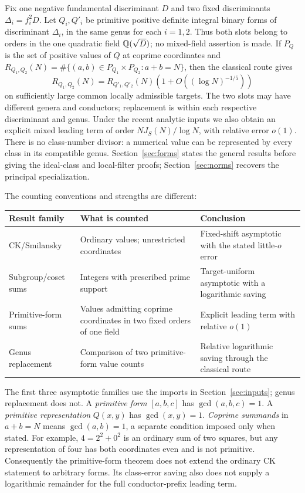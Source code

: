 Fix one negative fundamental discriminant \(D\) and two fixed
discriminants \(\Delta_i=f_i^2D\). Let \(Q_i,Q'_i\) be primitive
positive definite integral binary forms of discriminant \(\Delta_i\),
in the same genus for each \(i=1,2\). Thus both slots belong to
orders in the one quadratic field \(\mathbb Q(\sqrt D)\); no mixed-field
assertion is made. If \(P_Q\) is the set of positive values of
\(Q\) at coprime coordinates and
\(R_{Q_1,Q_2}(N)=\#\{(a,b)\in P_{Q_1}\times P_{Q_2}:a+b=N\}\),
then the classical route gives
\begin{equation}\label{eq:genus-headline}
 R_{Q_1,Q_2}(N)=R_{Q'_1,Q'_2}(N)
                  \left(1+O((\log N)^{-1/5})\right)
\end{equation}
on sufficiently large common locally admissible targets.
The two slots may have different genera and conductors; replacement
is within each respective discriminant and genus. Under the recent
analytic inputs we also obtain an explicit mixed leading term of
order \(NJ_S(N)/\log N\), with relative error \(o(1)\).
There is no class-number divisor: a numerical value can be represented
by every class in its compatible genus. Section~\ref{sec:forms}
states the general results before giving the ideal-class and local-filter
proofs; Section~\ref{sec:norms} recovers the principal specialization.

The counting conventions and strengths are different:
\begin{center}\small
\begin{tabular}{@{}>{\raggedright\arraybackslash}p{.19\linewidth}>{\raggedright\arraybackslash}p{.34\linewidth}>{\raggedright\arraybackslash}p{.41\linewidth}@{}}
\hline
Result family&What is counted&Conclusion\\\hline
CK/Smilansky&Ordinary values; unrestricted coordinates&Fixed-shift asymptotic with the stated little-\(o\) error\\[1mm]
Subgroup/coset sums&Integers with prescribed prime support&Target-uniform asymptotic with a logarithmic saving\\[1mm]
Primitive-form sums&Values admitting coprime coordinates in two fixed orders of one field&Explicit leading term with relative \(o(1)\)\\[1mm]
Genus replacement&Comparison of two primitive-form value counts&Relative logarithmic saving through the classical route\\\hline
\end{tabular}
\end{center}
The first three asymptotic families use the imports in
Section~\ref{sec:inputs}; genus replacement does not.
A \emph{primitive form} \([a,b,c]\) has \(\gcd(a,b,c)=1\).
A \emph{primitive representation} \(Q(x,y)\) has
\(\gcd(x,y)=1\). \emph{Coprime summands} in \(a+b=N\)
means \(\gcd(a,b)=1\), a separate condition imposed only when stated.
For example, \(4=2^2+0^2\) is an ordinary sum of two squares,
but any representation of four has both coordinates even and is
not primitive. Consequently the primitive-form theorem does not
extend the ordinary CK statement to arbitrary forms. Its class-error
saving also does not supply a logarithmic remainder for the full
conductor-prefix leading term.

